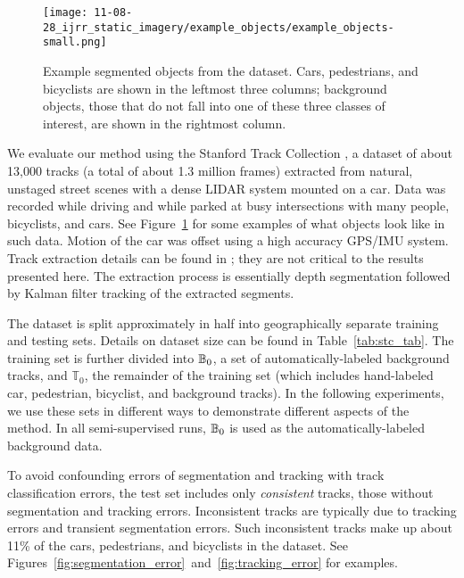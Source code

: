 \documentclass[conference]{IEEEtran}
\begin{document}
\begin{figure}
  \centering
  \texttt{[image: 11-08-28\_ijrr\_static\_imagery/example\_objects/example\_objects-small.png]}
  \caption{Example segmented objects from the dataset.  Cars, pedestrians, and bicyclists are shown in the leftmost three columns; background objects, \ie those that do not fall into one of these three classes of interest, are shown in the rightmost column.}
  \label{fig:example_objs}
\end{figure}



We evaluate our method using the Stanford Track Collection \citep{StanfordTrackCollection}, a dataset of about 13,000 tracks (a total of about 1.3 million frames) extracted from natural, unstaged street scenes with a dense LIDAR system mounted on a car.  Data was recorded while driving and while parked at busy intersections with many people, bicyclists, and cars.  See Figure~\ref{fig:example_objs} for some examples of what objects look like in such data.  Motion of the car was offset using a high accuracy GPS/IMU system.  Track extraction details can be found in \citep{Teichman2011}; they are not critical to the results presented here.  The extraction process is essentially depth segmentation followed by Kalman filter tracking of the extracted segments.

\newcommand{\T}{\ensuremath{\mathbb{T}}\xspace}

The dataset is split approximately in half into geographically separate training and testing sets.  Details on dataset size can be found in Table~\ref{tab:stc_tab}.  The training set is further divided into $\mathbb{B}_0$, a set of automatically-labeled background tracks, and $\T_0$, the remainder of the training set (which includes hand-labeled car, pedestrian, bicyclist, and background tracks).  In the following experiments, we use these sets in different ways to demonstrate different aspects of the method.  In all semi-supervised runs, $\mathbb{B}_0$ is used as the automatically-labeled background data.

To avoid confounding errors of segmentation and tracking with track classification errors, the test set includes only \textit{consistent} tracks, \ie those without segmentation and tracking errors. Inconsistent tracks are typically due to tracking errors and transient segmentation errors.  Such inconsistent tracks make up about 11\% of the cars, pedestrians, and bicyclists in the dataset.  See Figures~\ref{fig:segmentation_error}~and~\ref{fig:tracking_error} for examples.
\end{document}

